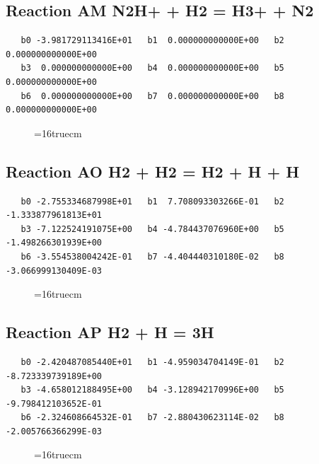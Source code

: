 \documentclass[12pt,dvipdfm]{article}
\begin{document}
\subsection{
Reaction AM N2H+ + H2 = H3+ + N2 }
\begin{small}\begin{verbatim}
   b0 -3.981729113416E+01   b1  0.000000000000E+00   b2  0.000000000000E+00
   b3  0.000000000000E+00   b4  0.000000000000E+00   b5  0.000000000000E+00
   b6  0.000000000000E+00   b7  0.000000000000E+00   b8  0.000000000000E+00
\end{verbatim}\end{small}
\begin{figure}[h!] \label{n2rates}
\epsfxsize=16truecm
\end{figure}
\newpage

\subsection{
Reaction AO H2 + H2 = H2 + H + H }
\begin{small}\begin{verbatim}
   b0 -2.755334687998E+01   b1  7.708093303266E-01   b2 -1.333877961813E+01
   b3 -7.122524191075E+00   b4 -4.784437076960E+00   b5 -1.498266301939E+00
   b6 -3.554538004242E-01   b7 -4.404440310180E-02   b8 -3.066999130409E-03
\end{verbatim}\end{small}
\begin{figure}[h!] \label{n2rates}
\epsfxsize=16truecm
\end{figure}
\newpage

\subsection{
Reaction AP H2 + H = 3H }
\begin{small}\begin{verbatim}
   b0 -2.420487085440E+01   b1 -4.959034704149E-01   b2 -8.723339739189E+00
   b3 -4.658012188495E+00   b4 -3.128942170996E+00   b5 -9.798412103652E-01
   b6 -2.324608664532E-01   b7 -2.880430623114E-02   b8 -2.005766366299E-03
\end{verbatim}\end{small}
\begin{figure}[h!] \label{n2rates}
\epsfxsize=16truecm
\end{figure}
\newpage
\end{document}
